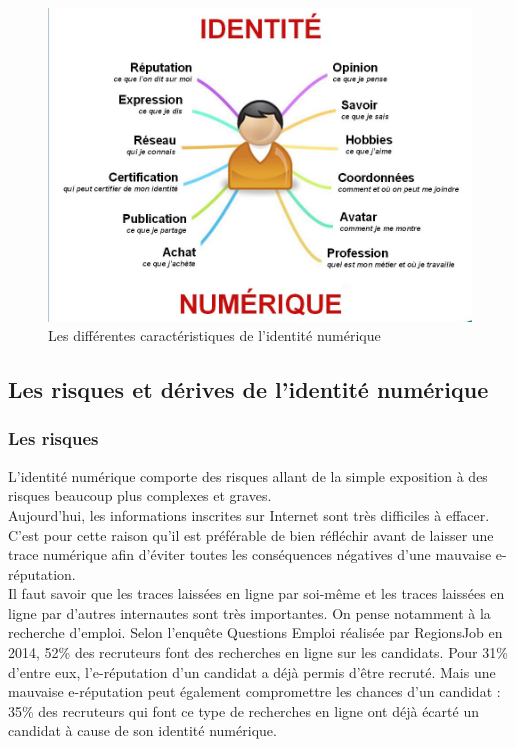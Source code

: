 \documentclass[12pt]{report}
\begin{document}
\begin{figure}[h]
    \includegraphics[width=180mm]{identite_num.png}
    \caption{Les différentes caractéristiques de l'identité numérique}
\label{fig:Les différentes caractéristiques de l'identité numérique}
  \end{figure}

\newpage
\subsection{Les risques et dérives de l'identité numérique}
\subsubsection{Les risques}
L'identité numérique comporte des risques allant de la simple exposition à des risques beaucoup plus complexes et graves.\\
Aujourd’hui, les informations inscrites sur Internet sont très difficiles à effacer. C’est pour cette raison qu’il est préférable de bien réfléchir avant de laisser une trace numérique afin d’éviter toutes les conséquences négatives d’une mauvaise e-réputation.\\

Il faut savoir que les traces laissées en ligne par soi-même et les traces laissées en ligne par d'autres internautes sont très importantes. On pense notamment à la recherche d'emploi. Selon l'enquête Questions Emploi réalisée par RegionsJob en 2014,  52\% des recruteurs font des recherches en ligne sur les candidats. Pour 31\% d'entre eux, l'e-réputation d'un candidat a déjà permis d'être recruté. Mais une mauvaise e-réputation peut également compromettre les chances d'un candidat : 35\% des recruteurs qui font ce type de recherches en ligne ont déjà écarté un candidat à cause de son identité numérique.\\
\end{document}
